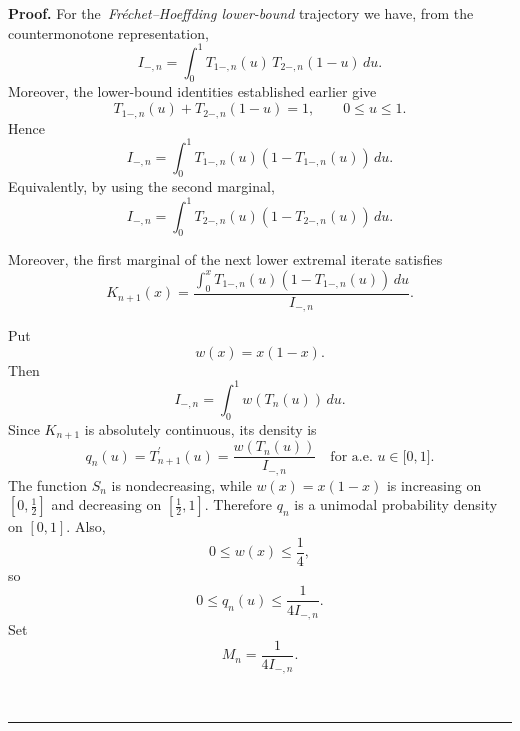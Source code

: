 \documentclass[onecolumn]{article}
\newenvironment{proof}[1][Proof]{\noindent\textbf{#1.} }{\ \rule{0.5em}{0.5em}}
\begin{document}
\begin{proof}
For the\textit{\ Fr\'{e}chet--Hoeffding lower-bound} trajectory we have,
from the countermonotone representation, 
\begin{equation}
I_{-,n}=\int_{0}^{1}T_{1-,n}(u)\,T_{2-,n}(1-u)\,du.  \label{345a27}
\end{equation}%
Moreover, the lower-bound identities established earlier give 
\begin{equation}
T_{1-,n}(u)+T_{2-,n}(1-u)=1,\qquad 0\leq u\leq 1.  \label{345a28}
\end{equation}%
Hence 
\begin{equation}
I_{-,n}=\int_{0}^{1}T_{1-,n}(u)(1-T_{1-,n}(u))\,du.  \label{345a29}
\end{equation}%
Equivalently, by using the second marginal, 
\begin{equation}
I_{-,n}=\int_{0}^{1}T_{2-,n}(u)(1-T_{2-,n}(u))\,du.  \label{345a30}
\end{equation}

Moreover, the first marginal of the next lower extremal iterate satisfies 
\begin{equation}
K_{n+1}(x)=\frac{\int_{0}^{x}T_{1-,n}(u)(1-T_{1-,n}(u))\,du}{I_{-,n}}.
\label{345a30f}
\end{equation}

Put 
\begin{equation}
w(x)=x(1-x).  \label{345a30g}
\end{equation}%
Then 
\begin{equation}
I_{-,n}=\int_{0}^{1}w(T_{n}(u))\,du.  \label{345a30h}
\end{equation}%
Since $K_{n+1}$ is absolutely continuous, its density is 
\begin{equation}
q_{n}(u)=T_{n+1}^{\prime }(u)=\frac{w(T_{n}(u))}{I_{-,n}}\quad \text{for
a.e. }u\in \lbrack 0,1].  \label{345a33}
\end{equation}%
The function $S_{n}$ is nondecreasing, while $w(x)=x(1-x)$ is increasing on $%
[0,\frac{1}{2}]$ and decreasing on $[\frac{1}{2},1]$. Therefore $q_{n}$ is a
unimodal probability density on $[0,1]$. Also, 
\begin{equation*}
0\leq w(x)\leq \frac{1}{4},
\end{equation*}%
so 
\begin{equation}
0\leq q_{n}(u)\leq \frac{1}{4I_{-,n}}.  \label{345a34}
\end{equation}%
Set 
\begin{equation}
M_{n}=\frac{1}{4I_{-,n}}.  \label{345a34a}
\end{equation}


\end{proof}
\end{document}
